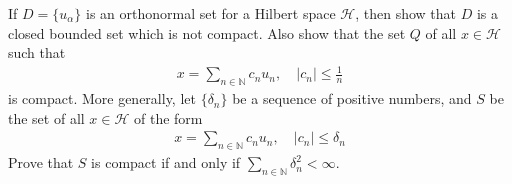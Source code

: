 \setcounter{exercise}{5}
\setcounter{solution}{5}
\begin{exercise}
  If $D = \{ u_\alpha  \}$ is an orthonormal set for a Hilbert space
  $\mathcal{H}$, then show that $D$ is a closed bounded set which is
  not compact. Also show that the set $Q$ of all $x \in \mathcal{H}$ such that
  \begin{align*}
    x = \sum_{n \in \mathbb{N}} c_n u_n, \quad |c_n| \le \frac{1}{n}
  \end{align*}
  is compact. More generally, let $ \{ \delta_n \}$ be a sequence of
  positive numbers, and $S$ be the set of all $x \in \mathcal{H}$ of the form
  \begin{align*}
    x = \sum_{n \in \mathbb{N}} c_n u_n, \quad |c_n| \le \delta_n
  \end{align*}
  Prove that $S$ is compact if and only if $ \sum_{n \in \mathbb{N}}
  \delta_n^2 < \infty$.
\end{exercise}
